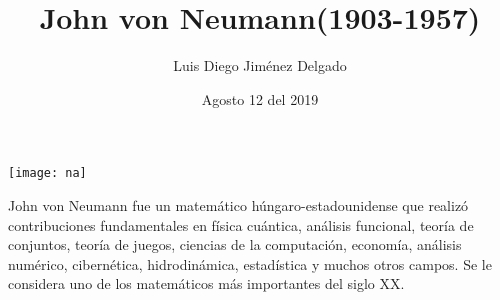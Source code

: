 \documentclass[12pt]{article}
\title{John von Neumann(1903-1957)}
\author{Luis Diego Jiménez Delgado}
\date{Agosto 12 del 2019}
\begin{document}
\maketitle
\begin{center}
\texttt{[image: na]}
\end{center}
John von Neumann fue un matemático húngaro-estadounidense que realizó contribuciones fundamentales en física cuántica, análisis funcional, teoría de conjuntos, teoría de juegos, ciencias de la computación, economía, análisis numérico, cibernética, hidrodinámica, estadística y muchos otros campos. Se le considera uno de los matemáticos más importantes del siglo XX.
\end{document}
